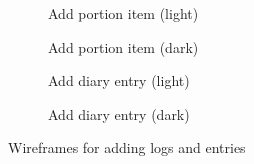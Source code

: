 \documentclass[../main.tex]{subfiles}
\begin{document}
\begin{figure}
    \centering
    \noindent\begin{subfigure}{.24\textwidth}
    \centering
    \caption{Add portion item (light)}
    \end{subfigure}\hfill
    \begin{subfigure}{.24\textwidth}
    \centering
    \caption{Add portion item (dark)}
    \end{subfigure}\hfill
    \begin{subfigure}{.24\textwidth}
    \centering
    \caption{Add diary entry (light)}
    \end{subfigure}\hfill
    \begin{subfigure}{.24\textwidth}
    \centering
    \caption{Add diary entry (dark)}
    \end{subfigure}
    \caption{Wireframes for adding logs and entries}%
\end{figure}
\end{document}
